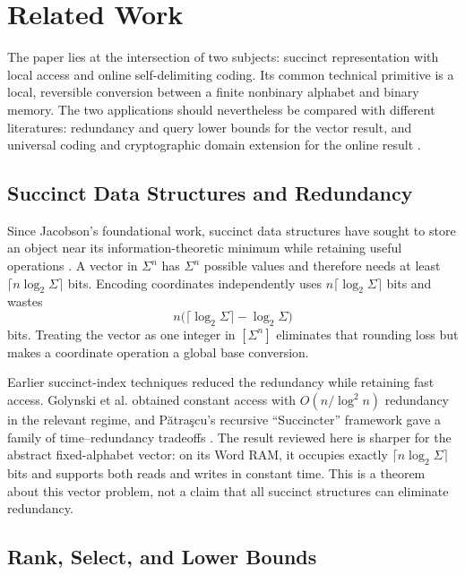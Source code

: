 \section{Related Work}
\label{sec:related-work}

The paper lies at the intersection of two subjects: succinct representation
with local access and online self-delimiting coding.  Its common technical
primitive is a local, reversible conversion between a finite nonbinary
alphabet and binary memory.  The two applications should nevertheless be
compared with different literatures: redundancy and query lower bounds for
the vector result, and universal coding and cryptographic domain extension
for the online result \cite{dodis2010changing}.

\subsection{Succinct Data Structures and Redundancy}

Since Jacobson's foundational work, succinct data structures have sought to
store an object near its information-theoretic minimum while retaining useful
operations \cite{jacobson1989space}.  A vector in \(\Sigma^n\) has
\(\Sigma^n\) possible values and therefore needs at least
\(\lceil n\log_2\Sigma\rceil\) bits.  Encoding coordinates independently
uses \(n\lceil\log_2\Sigma\rceil\) bits and wastes
\[
    n\bigl(\lceil\log_2\Sigma\rceil-\log_2\Sigma\bigr)
\]
bits.  Treating the vector as one integer in \([\Sigma^n]\) eliminates that
rounding loss but makes a coordinate operation a global base conversion.

Earlier succinct-index techniques reduced the redundancy while retaining
fast access.  Golynski et al. obtained constant access with
\(O(n/\log^2 n)\) redundancy in the relevant regime, and
P\u{a}tra\c{s}cu's recursive ``Succincter'' framework gave a family of
time--redundancy tradeoffs \cite{golynski2007size,patrascu2008succincter}.
The result reviewed here is sharper for the abstract fixed-alphabet vector:
on its Word RAM, it occupies exactly
\(\lceil n\log_2\Sigma\rceil\) bits and supports both reads and writes in
constant time.  This is a theorem about this vector problem, not a claim that
all succinct structures can eliminate redundancy.

\subsection{Rank, Select, and Lower Bounds}

